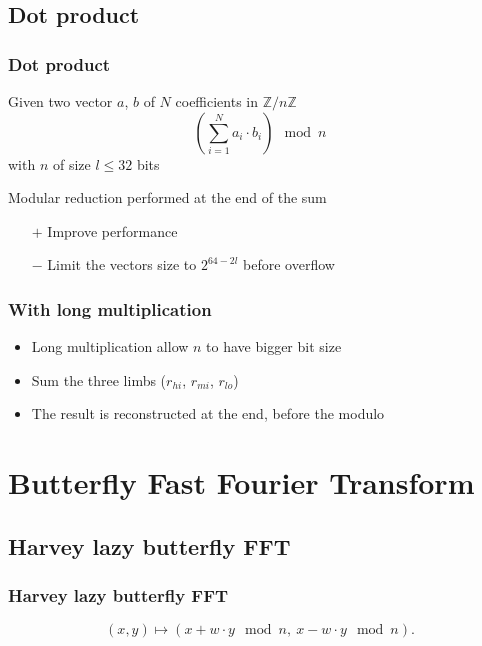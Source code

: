 \documentclass[10pt]{beamer}
\begin{document}
\subsection{Dot product}
\begin{frame}
    \frametitle{Dot product}
    \begin{example}
        Given two vector $a$, $b$ of $N$ coefficients in $\mathbb{Z}/n\mathbb{Z}$
        \[
            \left(\sum^N_{i=1}a_i\cdot b_i\right) \mod n
        \]
        with $n$ of size $l \leq 32$ bits
    \end{example}

    \pause
    Modular reduction performed at the end of the sum
    \begin{itemize}
        \item[$+$] Improve performance
        \item[$-$] Limit the vectors size to $2^{64 - 2l}$ before overflow
    \end{itemize}
\end{frame}

\begin{frame}
    \frametitle{With long multiplication} %
    \begin{itemize}
        \item Long multiplication allow $n$ to have bigger bit size
        \item Sum the three limbs ($r_{hi}$, $r_{mi}$, $r_{lo}$)
        \item The result is reconstructed at the end, before the modulo
    \end{itemize}
\end{frame}

\section{Butterfly Fast Fourier Transform}
\subsection{Harvey lazy butterfly FFT}
\begin{frame}
    \frametitle{Harvey lazy butterfly FFT}
    \[
    (x,y) \mapsto (x + w\cdot y \mod n,\ x - w\cdot y \mod n).
    \]
\end{frame}
\end{document}
